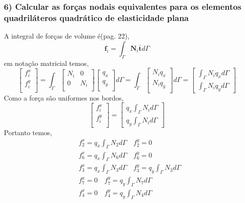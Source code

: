 \subsubsection{6) Calcular as forças nodais equivalentes para os elementos quadriláteros quadrático de elasticidade plana}

A integral de forças de volume é(pag. 22),
%
\begin{equation}
	\mathbf{f}_i = \int_{\Gamma} \mathbf{N}_i \mathbf{\bar t} d\Gamma
\end{equation}
%
em notação matricial temos,
%
\begin{equation}
	\begin{bmatrix}
		f^x_i\\
		f^y_i\\
	\end{bmatrix}
	=
	\int_{\Gamma}
	\begin{bmatrix}
		N_i&0\\
		0&N_i\\
	\end{bmatrix}
	\begin{bmatrix}
		q_x\\
		q_y\\
	\end{bmatrix}
	d\Gamma
	=
	\int_{\Gamma}
	\begin{bmatrix}
		N_i q_x\\
		N_i q_y\\
	\end{bmatrix}
	d\Gamma
	=
	\begin{bmatrix}
		\int_{\Gamma} N_i q_x d\Gamma\\
		\int_{\Gamma} N_i q_y d\Gamma
	\end{bmatrix}
\end{equation}
%
Como a força são uniformes nos bordos,
%
\begin{equation}
	\begin{bmatrix}
		f^x_i\\
		f^y_i\\
	\end{bmatrix}
	=
	\begin{bmatrix}
		q_x \int_{\Gamma} N_i d\Gamma\\
		q_y \int_{\Gamma} N_i d\Gamma
	\end{bmatrix}
\end{equation}
%
Portanto temos,
%
\begin{equation}
\begin{split}
&f^x_2 = q_x \int_{\Gamma} N_2 d\Gamma \quad f^y_2 = 0\\
&f^x_6 = q_x \int_{\Gamma} N_6 d\Gamma \quad f^y_6 = 0\\
&f^x_3 = q_x \int_{\Gamma} N_3 d\Gamma \quad f^y_3 =  q_y \int_{\Gamma} N_3 d\Gamma\\
&f^x_7 = 0 \quad f^y_7 =  q_y \int_{\Gamma} N_7 d\Gamma\\
&f^x_4 = 0 \quad f^y_4 = q_y \int_{\Gamma} N_4 d\Gamma
\end{split}
\end{equation}
